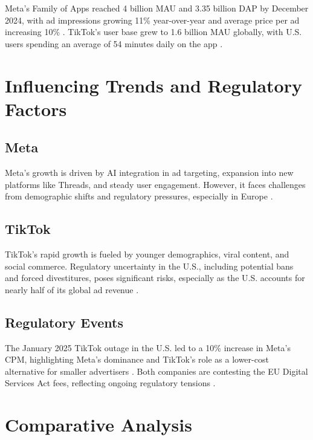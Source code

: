 \documentclass{article}
\begin{document}
Meta's Family of Apps reached 4 billion MAU and 3.35 billion DAP by December 2024, with ad impressions growing 11\% year-over-year and average price per ad increasing 10\% \cite{meta_q4_2024}. TikTok's user base grew to 1.6 billion MAU globally, with U.S. users spending an average of 54 minutes daily on the app \cite{tiktok_sendshort}.

\section{Influencing Trends and Regulatory Factors}

\subsection{Meta}

Meta's growth is driven by AI integration in ad targeting, expansion into new platforms like Threads, and steady user engagement. However, it faces challenges from demographic shifts and regulatory pressures, especially in Europe \cite{meta_q4_2024,meta_yahoo,meta_dsa}.

\subsection{TikTok}

TikTok's rapid growth is fueled by younger demographics, viral content, and social commerce. Regulatory uncertainty in the U.S., including potential bans and forced divestitures, poses significant risks, especially as the U.S. accounts for nearly half of its global ad revenue \cite{tiktok_economic_impact,cb_tiktok_ban,martech_meta_tiktok}.

\subsection{Regulatory Events}

The January 2025 TikTok outage in the U.S. led to a 10\% increase in Meta's CPM, highlighting Meta's dominance and TikTok's role as a lower-cost alternative for smaller advertisers \cite{cb_tiktok_ban}. Both companies are contesting the EU Digital Services Act fees, reflecting ongoing regulatory tensions \cite{meta_dsa}.

\section{Comparative Analysis}
\end{document}
